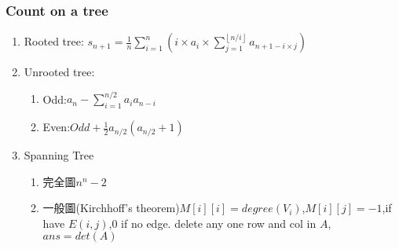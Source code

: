 \subsubsection{Count on a tree}
\begin{enumerate}\itemsep = -3pt
	\item Rooted tree: $s_{n+1}=\frac{1}{n}\sum_{i=1}^{n}(i\times a_i\times \sum_{j=1}^{\left \lfloor  n/i\right \rfloor} a_{n+1-i\times j})$
	\item Unrooted tree: 
	\begin{enumerate}\itemsep = -2pt
		\item Odd:$a_n-\sum_{i=1}^{n/2}a_ia_{n-i}$
		\item Even:$Odd+\frac{1}{2}a_{n/2}(a_{n/2}+1)$
	\end{enumerate}
	\item Spanning Tree
	\begin{enumerate}\itemsep = -2pt
		\item 完全圖$n^n-2$
		\item 一般圖(Kirchhoff's theorem)$M[i][i]=degree(V_i)$,$M[i][j]=-1$,if have $E(i,j)$,$0$ if no edge. delete any one row and col in $A$, $ans = det(A)$
	\end{enumerate}
\end{enumerate}

%